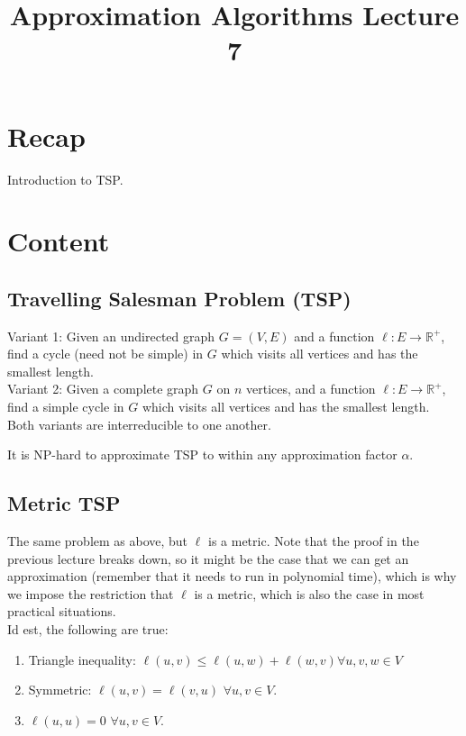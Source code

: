 \documentclass[a4paper]{article}
\title{\textbf{Approximation Algorithms Lecture 7}}
\date{}
\newcommand{\nl}{\vspace{0.2cm}\\}
\newcommand{\R}{\mathbb{R}}
\begin{document}
\maketitle
\tableofcontents

\section{Recap}

Introduction to TSP.

\section{Content}

\subsection{Travelling Salesman Problem (TSP)}

Variant 1: Given an undirected graph $G = (V, E)$ and a function $\ell : E \to \R^+$, find a cycle (need not be simple) in $G$ which visits all vertices and has the smallest length.\nl
Variant 2: Given a complete graph $G$ on $n$ vertices, and a function $\ell : E \to \R^+$, find a simple cycle in $G$ which visits all vertices and has the smallest length.\nl
Both variants are interreducible to one another.\nl
\begin{claim}
    It is NP-hard to approximate TSP to within any approximation factor $\alpha$.
\end{claim}

\subsection{Metric TSP}

The same problem as above, but $\ell$ is a metric. Note that the proof in the previous lecture breaks down, so it might be the case that we can get an approximation (remember that it needs to run in
polynomial time), which is why we impose the restriction that $\ell$ is a metric, which is also the case in most practical situations.\nl
Id est, the following are true:
\begin{enumerate}
    \item Triangle inequality: $\ell(u, v) \le \ell(u, w) + \ell(w, v) \forall u, v, w \in V$
    \item Symmetric: $\ell(u, v) = \ell(v, u)$ $\forall u, v \in V$.
    \item $\ell(u, u) = 0$ $\forall u, v \in V$.
\end{enumerate}
\end{document}
